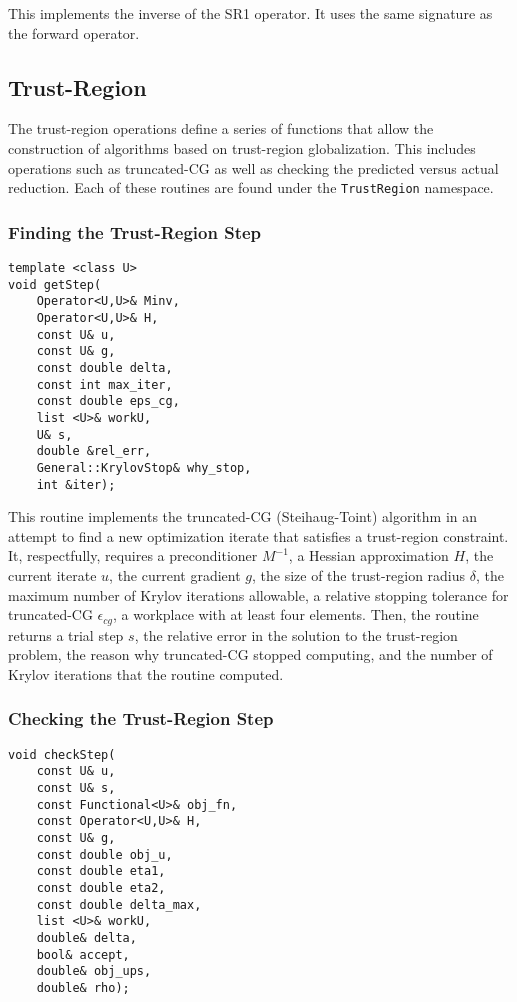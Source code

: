\documentclass{article}
\begin{document}
This implements the inverse of the SR1 operator.  It uses the same signature as the forward operator.

\subsection{Trust-Region}

    The trust-region operations define a series of functions that allow the construction of algorithms based on trust-region globalization.  This includes operations such as truncated-CG as well as checking the predicted versus actual reduction.  Each of these routines are found under the \texttt{TrustRegion} namespace.

\subsubsection{Finding the Trust-Region Step}

\begin{flushleft}
\begin{lstlisting}
template <class U>
void getStep(
    Operator<U,U>& Minv,
    Operator<U,U>& H,
    const U& u,
    const U& g,
    const double delta,
    const int max_iter,
    const double eps_cg,
    list <U>& workU,
    U& s,
    double &rel_err,
    General::KrylovStop& why_stop,
    int &iter);
\end{lstlisting}
\end{flushleft}

This routine implements the truncated-CG (Steihaug-Toint) algorithm in an attempt to find a new optimization iterate that satisfies a trust-region constraint.  It, respectfully, requires a preconditioner $M^{-1}$, a Hessian approximation $H$, the current iterate $u$, the current gradient $g$, the size of the trust-region radius $\delta$, the maximum number of Krylov iterations allowable, a relative stopping tolerance for truncated-CG $\epsilon_{cg}$, a workplace with at least four elements.  Then, the routine returns a trial step $s$, the relative error in the solution to the trust-region problem, the reason why truncated-CG stopped computing, and the number of Krylov iterations that the routine computed.

\subsubsection{Checking the Trust-Region Step}

\begin{flushleft}
\begin{lstlisting}
void checkStep(
    const U& u,
    const U& s,
    const Functional<U>& obj_fn,
    const Operator<U,U>& H,
    const U& g,
    const double obj_u,
    const double eta1,
    const double eta2,
    const double delta_max,
    list <U>& workU,
    double& delta,
    bool& accept,
    double& obj_ups,
    double& rho);
\end{lstlisting}
\end{flushleft}
\end{document}
